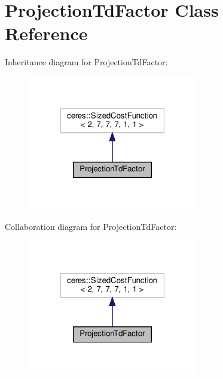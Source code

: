 \hypertarget{classProjectionTdFactor}{}\section{Projection\+Td\+Factor Class Reference}
\label{classProjectionTdFactor}


Inheritance diagram for Projection\+Td\+Factor\+:\nopagebreak
\begin{figure}[H]
\begin{center}
\leavevmode
\includegraphics[width=210pt]{classProjectionTdFactor__inherit__graph}
\end{center}
\end{figure}


Collaboration diagram for Projection\+Td\+Factor\+:\nopagebreak
\begin{figure}[H]
\begin{center}
\leavevmode
\includegraphics[width=210pt]{classProjectionTdFactor__coll__graph}
\end{center}
\end{figure}
